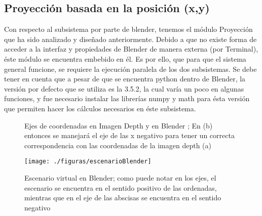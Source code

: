 \documentclass[a4paper,openright,12pt]{report}
\begin{document}
\subsection{Proyección basada en la posición (x,y)}
Con respecto al subsistema por parte de blender, tenemos el módulo Proyección que ha sido analizado y diseñado anteriormente. Debido a que no existe forma de acceder a la interfaz y propiedades de Blender de manera externa (por Terminal), éste módulo se encuentra embebido en él. Es por ello, que para que el sistema general funcione, se requiere la ejecución paralela de los dos subsistemas. Se debe tener en cuenta que a pesar de que se encuentra python dentro de Blender, la versión por defecto que se utiliza es la 3.5.2, la cual varía un poco en algunas funciones, y fue necesario instalar las librerías numpy y math para ésta versión que permiten hacer los cálculos necesarios en éste subsistema.\\
\begin{figure}[htb]
	\centering
	\caption[Ejes de coordenadas en Imagen Depth y en Blender]{Ejes de coordenadas en Imagen Depth y en Blender ; En (b) entonces se manejará el eje de las x negativo para tener un correcta correspondencia con las coordenadas de la imagen depth (a)} \label{fig:coords}
\end{figure}
\begin{figure}[thb]
	\centering
	\vspace*{5mm}
	\texttt{[image: ./figuras/escenarioBlender]}
	\caption[Escenario virtual en Blender]{Escenario virtual en Blender; como puede notar en los ejes, el escenario se encuentra en el sentido positivo de las ordenadas, mientras que en el eje de las abscisas se encuentra en el sentido negativo} \label{fig:escenarioBlender}
\end{figure}
\end{document}

